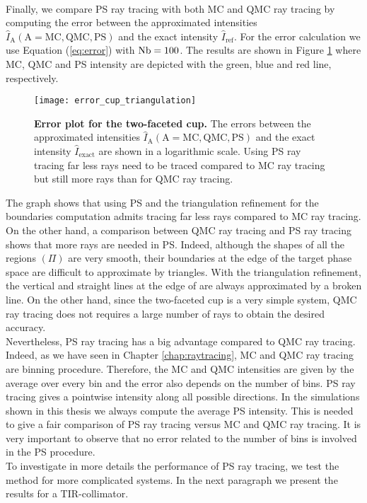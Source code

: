 \\ \indent 
Finally, we compare PS ray tracing with both MC and QMC ray tracing by computing the error between the approximated intensities $\hat{I}_{\textrm{A}}  (\textrm{A}= \textrm{MC}, \textrm{QMC}, \textrm{PS})$ and the exact intensity $\hat{I}_{\textrm{ref}}$. For the error calculation we use Equation (\ref{eq:error}) with $\textrm{Nb} = 100$. The results are shown in Figure \ref{fig:error_cup_triangulation} where MC, QMC and PS intensity are depicted with the green, blue and red line, respectively.
 \begin{figure}[h]
  \center
  \texttt{[image: error\_cup\_triangulation]}
  \caption{\textbf{Error plot for the two-faceted cup.} The errors between the approximated intensities $\hat{I}_{\textrm{A}} (\textrm{A}= \textrm{MC}, \textrm{QMC}, \textrm{PS})$ and the exact intensity $\hat{I}_{\textrm{exact}}$ are shown in a logarithmic scale. Using PS ray tracing far less rays need to be traced compared to MC ray tracing but still more rays than for QMC ray tracing.}
  \label{fig:error_cup_triangulation}
\end{figure}
The graph shows that using PS and the triangulation refinement for the boundaries computation admits tracing far less rays compared to MC ray tracing.
On the other hand, a comparison between QMC ray tracing and PS ray tracing shows that more rays are needed in PS. Indeed, although the shapes of all the regions $(\Pi)$ are very smooth, their boundaries at the edge of the target phase space  are difficult to approximate by triangles. With the triangulation refinement, the vertical and straight lines at the edge of  are always approximated by a broken line. On the other hand, since the two-faceted cup is a very simple system, QMC ray tracing does not requires a large number of rays to obtain the desired accuracy. \\ \indent Nevertheless, PS ray tracing has a big advantage compared to QMC ray tracing. Indeed, as we have seen in Chapter \ref{chap:raytracing}, MC and QMC ray tracing are binning procedure. Therefore, the MC and QMC intensities are given by the average over every bin and the error also depends on the number of bins. %
PS ray tracing gives a pointwise intensity along all possible directions. In the simulations shown in this thesis we always compute the average PS intensity. This is needed to give a fair comparison of PS ray tracing versus MC and QMC ray tracing. It is very important to observe that no error related to the number of bins is involved in the PS procedure. \\ \indent
To investigate in more details the performance of PS ray tracing, we test the method for more complicated systems. In the next paragraph we present the results for a TIR-collimator. 
